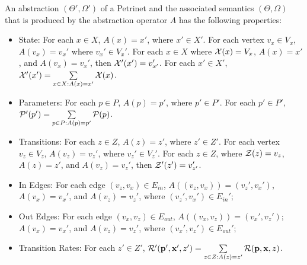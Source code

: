 \begin{definition}
    An abstraction $(\Theta', \Omega')$ of a Petrinet and the associated
    semantics $(\Theta, \Omega)$ that is produced by the abstraction operator
    $A$ has the following properties:
    \begin{itemize}
        \item State: For each $x \in X$,  $A(x) = x'$, where $x' \in
        X'$.  For each vertex $v_x \in V_x$,  $A(v_x) = v_x'$ where $v_x' \in
        V_x'$.   For each $x\in X$ where  ${\cal X}(x) =
        V_x$, $A(x) = x'$, and $A(v_x) = v_x'$, then ${\cal X}'(x')=
        v_{x'}'$.  For each $x' \in X'$, ${\cal X}'(x') = \sum\limits_{x \in X: A(x) = x'} {\cal X}(x)$.
        \item Parameters: For each $p \in P$, $A(p) = p'$, where $p'\in P'$.
        For each $p' \in P'$, ${\cal P}'(p') = \sum\limits_{p \in P: A(p) = p'} {\cal P}(p)$.
        \item Transitions: For each $z \in Z$, $A(z) = z'$, where $z' \in Z'$.
        For each vertex $v_z \in V_z$, $A(v_z) = v_z'$, where $v_z' \in V_z'$.
        For each $z \in Z$, where ${\cal
        Z}(z) = v_z$, $A(z) = z'$, and $A(v_z) = v_z'$, then ${\cal
        Z}'(z') = v_{z'}'$. 
        \item In Edges: For each edge $(v_z, v_x) \in E_{in}$, $A((v_z, v_x)) =
        (v_z', v_x')$, $A(v_x) = v_x'$, and $A(v_z) = v_z'$, where $(v_z',
        v_x')\in E_{in}'$;
        \item Out Edges: For each edge $(v_x, v_z) \in E_{out}$, $A((v_x, v_z))
        = (v_x', v_z')$; $A(v_x) = v_x'$, and $A(v_z) = v_z'$, where $(v_x',
        v_z')\in E_{out}'$;

        
        \item Transition Rates: For each $z' \in Z'$, ${\cal R}'({\bf p}', {\bf
        x}', z') = \sum\limits_{z \in Z: A(z)=z'} {\cal R}({\bf p}, {\bf
        x}, z)$.
    \end{itemize}
\end{definition}

